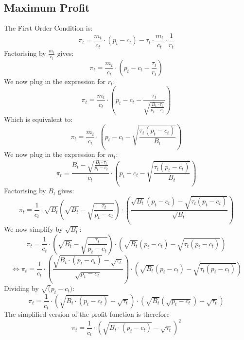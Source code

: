 \documentclass{article}
\begin{document}
\subsection{Maximum Profit}
\label{sec:proof5}

The First Order Condition is:
$$\pi_{t}= \frac{m_{t}}{c_{t}}\cdot\left(p_{t}-c_{t}\right)-\tau_{t}\cdot \frac{m_{t}}{c_{t}}\cdot \frac{1}{r_{t}}$$
Factorising by $\frac{m_{t}}{c_{t}}$ gives:
$$\pi_{t}=\frac{m_{t}}{c_{t}}\cdot\left(p_{t}-c_{t}-\frac{\tau_{t}}{r_{t}}\right)$$
We now plug in the expression for $r_{t}$:
$$\pi_{t}=\frac{m_{t}}{c_{t}}\cdot\left(p_{t}-c_{t}-\frac{\tau_{t}}{\sqrt{\frac{B_{t}\cdot \tau_{t}}{p_{t}-c_{t}}}}\right)$$
Which is equivalent to:
$$\pi_{t}=\frac{m_{t}}{c_{t}}\cdot\left(p_{t}-c_{t}-\sqrt{\frac{\tau_{t}(p_{t}-c_{t})}{B_{t}}}\right)$$
We now plug in the expression for $m_{t}$:
$$\pi_{t}=\frac{B_{t}-\sqrt{\frac{B_{t}\cdot \tau_{t}}{p_{t}-c_{t}}}}{c_{t}}\cdot\left(p_{t}-c_{t}-\sqrt{\frac{\tau_{t}(p_{t}-c_{t})}{B_{t}}}\right)$$
Factorising by $B_{t}$ gives:
$$\pi_{t}=\frac{1}{c_{t}}\cdot\sqrt{B_{t}}\left(\sqrt{B_{t}}-\sqrt{\frac{\tau_{t}}{p_{t}-c_{t}}}\right)\cdot\left(\frac{\sqrt{B_{t}}(p_{t}-c_{t})-\sqrt{\tau_{t}(p_{t}-c_{t})}}{\sqrt{B_{t}}}\right)$$
We now simplify by $\sqrt{B_{t}}$:
$$\pi_{t}=\frac{1}{c_{t}}\cdot\left(\sqrt{B_{t}}-\sqrt{\frac{\tau_{t}}{p_{t}-c_{t}}}\right)\cdot\left(\sqrt{B_{t}}(p_{t}-c_{t})-\sqrt{\tau_{t}(p_{t}-c_{t})}\right)$$
$$\Leftrightarrow\pi_{t}=\frac{1}{c_{t}}\cdot\left(\frac{\sqrt{B_{t}\cdot (p_{t}-c_{t})}-\sqrt{\tau_{t}}}{\sqrt{p_{t}-c_{t}}}\right)\cdot\left(\sqrt{B_{t}}(p_{t}-c_{t})-\sqrt{\tau_{t}(p_{t}-c_{t})}\right)$$
Dividing by $\sqrt(p_{t}-c_{t})$:
$$\pi_{t}=\frac{1}{c_{t}}\cdot\left({\sqrt{B_{t}\cdot (p_{t}-c_{t})}-\sqrt{\tau_{t}}}\right)\cdot\left(\sqrt{B_{t}}(\sqrt{p_{t}-c_{t}})-\sqrt{\tau_{t}}\right)$$
The simplified version of the profit function is therefore
\begin{equation}\tag{7}
    \pi_{t}=\frac{1}{c_{t}}\cdot\left({\sqrt{B_{t}\cdot (p_{t}-c_{t})}-\sqrt{\tau_{t}}}\right)^{2}
\end{equation}
\end{document}
